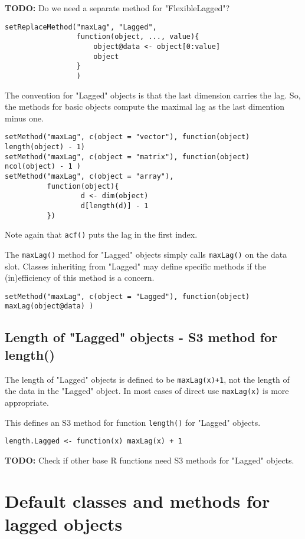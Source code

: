 \documentclass[11pt,a4paper]{article}
\begin{document}
\textbf{TODO:} Do we need a separate method for "FlexibleLagged"?
\begin{verbatim}
setReplaceMethod("maxLag", "Lagged",
                 function(object, ..., value){
                     object@data <- object[0:value]
                     object
                 }
                 )
\end{verbatim}

The convention for "Lagged" objects is that the last dimension carries the lag.  So, the
methods for basic objects compute the maximal lag as the last dimention minus one.
\begin{verbatim}
setMethod("maxLag", c(object = "vector"), function(object) length(object) - 1)
setMethod("maxLag", c(object = "matrix"), function(object) ncol(object) - 1 )
setMethod("maxLag", c(object = "array"),
          function(object){
                  d <- dim(object)
                  d[length(d)] - 1
          })
\end{verbatim}
Note again that \texttt{acf()} puts the lag in the first index.

The \texttt{maxLag()} method for "Lagged" objects simply calls \texttt{maxLag()} on the data slot. Classes
inheriting from "Lagged" may define specific methods if the (in)efficiency of this method is
a concern.
\begin{verbatim}
setMethod("maxLag", c(object = "Lagged"), function(object) maxLag(object@data) )
\end{verbatim}


\subsection{Length of "Lagged" objects - S3 method for length()}
\label{sec:org1788c69}

The length of "Lagged" objects is defined to be \texttt{maxLag(x)+1}, not the length of the data in
the "Lagged" object. In most cases of direct use \texttt{maxLag(x)} is more appropriate.

This defines an S3 method for function \texttt{length()} for "Lagged" objects.
\begin{verbatim}
length.Lagged <- function(x) maxLag(x) + 1
\end{verbatim}

\textbf{TODO:} Check if other base R functions need S3 methods for "Lagged" objects.



\section{Default classes and methods for lagged objects}
\label{sec:orgd1a169d}
\end{document}
